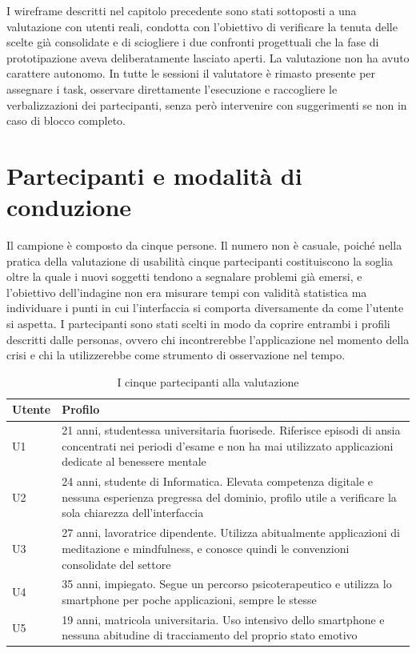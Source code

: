 I wireframe descritti nel capitolo precedente sono stati sottoposti a una valutazione con utenti reali, condotta con l'obiettivo di verificare la tenuta delle scelte già consolidate e di sciogliere i due confronti progettuali che la fase di prototipazione aveva deliberatamente lasciato aperti.
La valutazione non ha avuto carattere autonomo.
In tutte le sessioni il valutatore è rimasto presente per assegnare i task, osservare direttamente l'esecuzione e raccogliere le verbalizzazioni dei partecipanti, senza però intervenire con suggerimenti se non in caso di blocco completo.

\section{Partecipanti e modalità di conduzione}
\label{sec:partecipanti}

Il campione è composto da cinque persone.
Il numero non è casuale, poiché nella pratica della valutazione di usabilità cinque partecipanti costituiscono la soglia oltre la quale i nuovi soggetti tendono a segnalare problemi già emersi, e l'obiettivo dell'indagine non era misurare tempi con validità statistica ma individuare i punti in cui l'interfaccia si comporta diversamente da come l'utente si aspetta.
I partecipanti sono stati scelti in modo da coprire entrambi i profili descritti dalle personas, ovvero chi incontrerebbe l'applicazione nel momento della crisi e chi la utilizzerebbe come strumento di osservazione nel tempo.

\begin{table}[htbp]
    \centering
    \small
    \renewcommand{\arraystretch}{1.3}
    \begin{tabularx}{\textwidth}{L{1.6cm} X}
        \toprule
        \textbf{Utente} & \textbf{Profilo} \\
        \midrule
        U1 & 21 anni, studentessa universitaria fuorisede. Riferisce episodi di ansia concentrati nei periodi d'esame e non ha mai utilizzato applicazioni dedicate al benessere mentale \\
        U2 & 24 anni, studente di Informatica. Elevata competenza digitale e nessuna esperienza pregressa del dominio, profilo utile a verificare la sola chiarezza dell'interfaccia \\
        U3 & 27 anni, lavoratrice dipendente. Utilizza abitualmente applicazioni di meditazione e mindfulness, e conosce quindi le convenzioni consolidate del settore \\
        U4 & 35 anni, impiegato. Segue un percorso psicoterapeutico e utilizza lo smartphone per poche applicazioni, sempre le stesse \\
        U5 & 19 anni, matricola universitaria. Uso intensivo dello smartphone e nessuna abitudine di tracciamento del proprio stato emotivo \\
        \bottomrule
    \end{tabularx}
    \caption{I cinque partecipanti alla valutazione}
    \label{tab:partecipanti}
\end{table}

